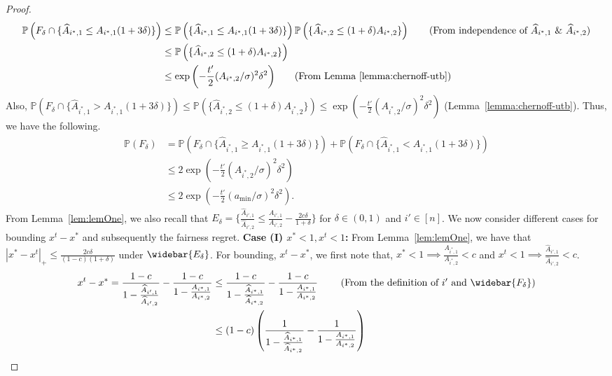 \begin{proof}
\begin{align*}
    \mathbb{P}\left(F_\delta \cap \{\widehat{A}_{i^*, 1}\leq A_{i^*, 1}(1+3\delta) \}\right) &\leq \mathbb{P}\left(\{\widehat{A}_{i^*, 1}\leq A_{i^*, 1}(1+3\delta) \}\right) \mathbb{P}\left(\{ \widehat{A}_{i^*, 2}\leq (1+\delta)A_{i^*, 2} \}\right) \tag{From independence of $\widehat{A}_{i^*, 1}$ \& $\widehat{A}_{i^*, 2}$}\\
    &\leq \mathbb{P}\left(\{ \widehat{A}_{i^*, 2}\leq (1+\delta)A_{i^*, 2} \}\right)\\
    &\leq \exp{\left(-\frac{t'}{2}(A_{i^*, 2}/\sigma)^2\delta^2 \right)} \tag{From Lemma~\ref{lemma:chernoff-utb}}
\end{align*}
Also, $\mathbb{P}(F_\delta \cap \{\widehat{A}_{i^*, 1}> A_{i^*, 1}(1+3\delta) \})\leq \mathbb{P}(\{\widehat{A}_{i^*, 2}\leq (1+\delta)A_{i^*, 2}\})\leq \exp{\left(-\frac{t'}{2}(A_{i^*, 2}/\sigma)^2\delta^2 \right)}$ (Lemma~\ref{lemma:chernoff-utb}). Thus, we have the following.
\begin{align*}
    \mathbb{P}(F_\delta) &= \mathbb{P}(F_\delta\cap \{\widehat{A}_{i^*, 1}\geq A_{i^*, 1}(1+3\delta) \}) + \mathbb{P}(F_\delta\cap \{\widehat{A}_{i^*, 1}< A_{i^*, 1}(1+3\delta) \})\\
    & \leq 2\exp\left(-\frac{t'}{2}(A_{i^*, 2}/\sigma)^2\delta^2 \right)
    \\
    &\leq  2\exp\left(-\frac{t'}{2}(a_{\min}/\sigma)^2\delta^2 \right).
\end{align*}
From Lemma~\ref{lem:lemOne}, we also recall that $E_\delta=\{\frac{\widehat{A}_{i', 1}}{\widehat{A}_{i', 2}}\leq \frac{A_{i', 1}}{A_{i', 2}}-\frac{2c\delta}{1+\delta}\}$ for $\delta \in (0, 1)$ and $i'\in [n]$.
We now consider different cases for bounding $x^t-x^*$ and subsequently the fairness regret.
\newline
\textbf{Case (I) $x^*<1, x^t<1$:} 
From Lemma~\ref{lem:lemOne}, we have that $|x^*-x^t|_+\leq \frac{2c\delta}{(1-c)(1+\delta)}$ under $\widebar{E_\delta}$.
For bounding, $x^t-x^*$, we first note that, $x^*<1\implies \frac{A_{i^*, 1}}{A_{i^*, 2}}<c$ and $x^t<1\implies \frac{\widehat{A}_{i', 1}}{\widehat{A}_{i', 2}}<c$.
\begin{align*}
    x^t-x^* = \frac{1-c}{1-\frac{\widehat{A}_{i',1}}{\widehat{A}_{i',2}}}-\frac{1-c}{1-\frac{A_{i^*,1}}{A_{i^*,2}}} &\leq \frac{1-c}{1-\frac{\widehat{A}_{i^*,1}}{\widehat{A}_{i^*,2}}}-\frac{1-c}{1-\frac{A_{i^*,1}}{A_{i^*,2}}} \ \tag{From the definition of $i'$ and $\widebar{F_\delta}$}\\
    &\leq (1-c) \left(\frac{1}{1-\frac{\widehat{A}_{i^*,1}}{\widehat{A}_{i^*,2}}}-\frac{1}{1-\frac{A_{i^*,1}}{A_{i^*,2}}}\right)

\end{align*}
\end{proof}
